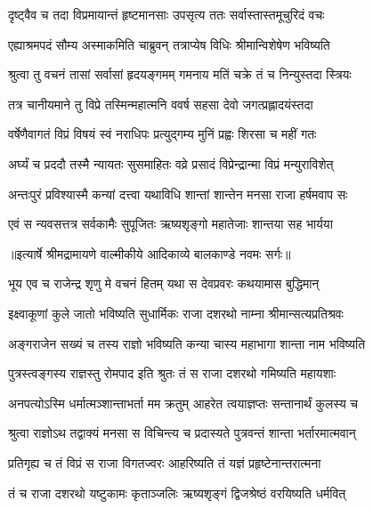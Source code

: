 \twolineshloka
{दृष्ट्वैव च तदा विप्रमायान्तं हृष्टमानसाः}
{उपसृत्य ततः सर्वास्तास्तमूचुरिदं वचः} %

\twolineshloka
{एह्याश्रमपदं सौम्य अस्माकमिति चाब्रुवन्}
{तत्राप्येष विधिः श्रीमान्विशेषेण भविष्यति} %

\twolineshloka
{श्रुत्वा तु वचनं तासां सर्वासां हृदयङ्गमम्}
{गमनाय मतिं चक्रे तं च निन्युस्तदा स्त्रियः} %

\twolineshloka
{तत्र चानीयमाने तु विप्रे तस्मिन्महात्मनि}
{ववर्ष सहसा देवो जगत्प्रह्लादयंस्तदा} %

\twolineshloka
{वर्षेणैवागतं विप्रं विषयं स्वं नराधिपः}
{प्रत्युद्गम्य मुनिं प्रह्वः शिरसा च महीं गतः} %

\twolineshloka
{अर्घ्यं च प्रददौ तस्मै न्यायतः सुसमाहितः}
{वव्रे प्रसादं विप्रेन्द्रान्मा विप्रं मन्युराविशेत्} %

\twolineshloka
{अन्तःपुरं प्रविश्यास्मै कन्यां दत्त्वा यथाविधि}
{शान्तां शान्तेन मनसा राजा हर्षमवाप सः} %

\twolineshloka
{एवं स न्यवसत्तत्र सर्वकामैः सुपूजितः}
{ऋष्यशृङ्गो महातेजाः शान्तया सह भार्यया} %


{॥इत्यार्षे श्रीमद्रामायणे वाल्मीकीये आदिकाव्ये बालकाण्डे नवमः सर्गः॥}


\twolineshloka
{भूय एव च राजेन्द्र शृणु मे वचनं हितम्}
{यथा स देवप्रवरः कथयामास बुद्धिमान्} %

\twolineshloka
{इक्ष्वाकूणां कुले जातो भविष्यति सुधार्मिकः}
{राजा दशरथो नाम्ना श्रीमान्सत्यप्रतिश्रवः} %

\twolineshloka
{अङ्गराजेन सख्यं च तस्य राज्ञो भविष्यति}
{कन्या चास्य महाभागा शान्ता नाम भविष्यति} %

\twolineshloka
{पुत्रस्त्वङ्गस्य राज्ञस्तु रोमपाद इति श्रुतः}
{तं स राजा दशरथो गमिष्यति महायशाः} %

\twolineshloka
{अनपत्योऽस्मि धर्मात्मञ्शान्ताभर्ता मम क्रतुम्}
{आहरेत त्वयाज्ञप्तः सन्तानार्थं कुलस्य च} %

\twolineshloka
{श्रुत्वा राज्ञोऽथ तद्वाक्यं मनसा स विचिन्त्य च}
{प्रदास्यते पुत्रवन्तं शान्ता भर्तारमात्मवान्} %

\twolineshloka
{प्रतिगृह्य च तं विप्रं स राजा विगतज्वरः}
{आहरिष्यति तं यज्ञं प्रहृष्टेनान्तरात्मना} %

\twolineshloka
{तं च राजा दशरथो यष्टुकामः कृताञ्जलिः}
{ऋष्यशृङ्गं द्विजश्रेष्ठं वरयिष्यति धर्मवित्} %


